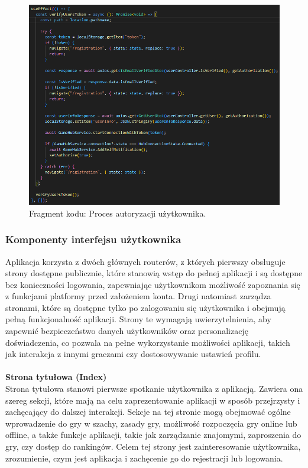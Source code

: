 \documentclass[12pt,a4paper]{article}
\begin{document}
\vspace{1cm}
\begin{figure}[h!]
    \centering
    \includegraphics[width=1\textwidth]{images/ex_router_authorization.png}
    \caption{Fragment kodu: Proces autoryzacji użytkownika.}
\end{figure}

\newpage

\subsubsection{Komponenty interfejsu użytkownika}

Aplikacja korzysta z dwóch głównych routerów, z których pierwszy obsługuje strony dostępne publicznie, które stanowią wstęp do pełnej aplikacji i są dostępne bez konieczności logowania, zapewniając użytkownikom możliwość zapoznania się z funkcjami platformy przed założeniem konta. Drugi natomiast zarządza stronami, które są dostępne tylko po zalogowaniu się użytkownika i obejmują pełną funkcjonalność aplikacji. Strony te wymagają uwierzytelnienia, aby zapewnić bezpieczeństwo danych użytkowników oraz personalizację doświadczenia, co pozwala na pełne wykorzystanie możliwości aplikacji, takich jak interakcja z innymi graczami czy dostosowywanie ustawień profilu.
\\\\

\noindent \textbf{Strona tytułowa (Index)}\\
Strona tytułowa stanowi pierwsze spotkanie użytkownika z aplikacją. Zawiera ona szereg sekcji, które mają na celu zaprezentowanie aplikacji w sposób przejrzysty i zachęcający do dalszej interakcji. Sekcje na tej stronie mogą obejmować ogólne wprowadzenie do gry w szachy, zasady gry, możliwość rozpoczęcia gry online lub offline, a także funkcje aplikacji, takie jak zarządzanie znajomymi, zaproszenia do gry, czy dostęp do rankingów. Celem tej strony jest zainteresowanie użytkownika, zrozumienie, czym jest aplikacja i zachęcenie go do rejestracji lub logowania.
\\
\end{document}
